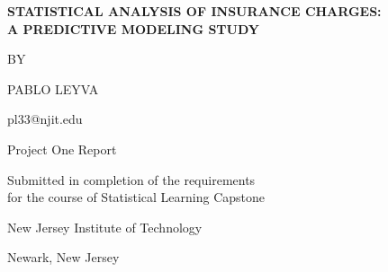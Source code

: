 \documentclass[12pt,a4paper]{article}
\begin{document}
\begin{titlepage}
\begin{center}

\vspace*{1.5in}

{\Large \textbf{STATISTICAL ANALYSIS OF INSURANCE CHARGES: \\
A PREDICTIVE MODELING STUDY}}

\vspace{1in}

{\large BY}

\vspace{0.2in}

{\large PABLO LEYVA}

\vspace{0.2in}

{\large pl33@njit.edu}

\vspace{1.2in}

{\large Project One Report}

\vspace{0.2in}

{\large Submitted in completion of the requirements \\
for the course of Statistical Learning Capstone}

\vspace{1in}

{\large New Jersey Institute of Technology}

\vspace{0.2in}

{\large Newark, New Jersey}

\vspace{0.3in}

\end{center}
\end{titlepage}

\begin{abstract}
This study presents a comprehensive statistical analysis of insurance charges using demographic and health-related predictors. We employed linear regression and Ridge regression techniques to identify key factors influencing insurance costs and develop predictive models. Our analysis reveals that smoking status is the most significant predictor of insurance charges, followed by the number of children, BMI, age, region, and sex. The final linear regression model achieved an R-squared value of 0.769, explaining approximately 77\% of the variance in insurance charges.
\end{abstract}
\end{document}
